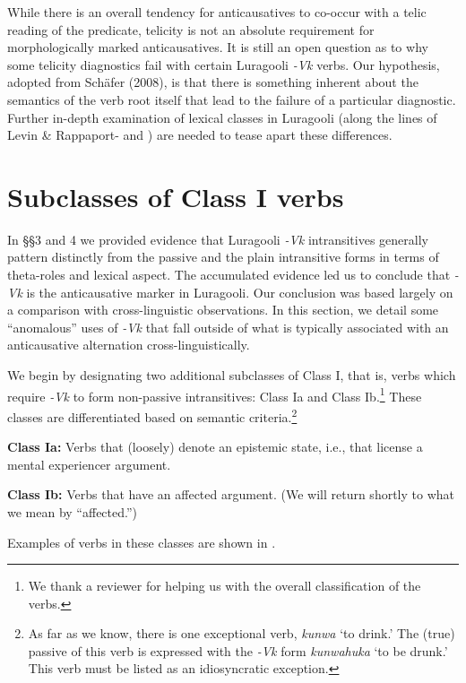 \documentclass[output=paper]{langsci/langscibook}
\begin{document}
While there is an overall tendency for anticausatives to co-occur with a telic reading of the predicate, telicity is not an absolute requirement for morphologically marked anticausatives. It is still an open question as to why some telicity diagnostics fail with certain Luragooli \textit{-Vk} verbs. Our hypothesis, adopted from Schäfer (2008), is that there is something inherent about the semantics of the verb root itself that lead to the failure of a particular diagnostic. Further in-depth examination of lexical classes in Luragooli (along the lines of Levin \& Rappaport-\citet{Hovav1995} and \citet{Haspelmath2005}) are needed to tease apart these differences. 

\section{Subclasses of Class I verbs}

In §§3 and 4 we provided evidence that Luragooli \textit{-Vk} intransitives generally pattern distinctly from the passive and the plain intransitive forms in terms of theta-roles and lexical aspect. The accumulated evidence led us to conclude that \textit{-Vk} is the anticausative marker in Luragooli. Our conclusion was based largely on a comparison with cross-linguistic observations. In this section, we detail some “anomalous” uses of \textit{-Vk} that fall outside of what is typically associated with an anticausative alternation cross-linguistically.

We begin by designating two additional subclasses of Class I, that is, verbs which require \textit{-Vk} to form non-passive intransitives: Class Ia and Class Ib.\footnote{We thank a reviewer for helping us with the overall classification of the verbs.} These classes are differentiated based on semantic criteria.\footnote{ As far as we know, there is one exceptional verb, \textit{kunwa} ‘to drink.’ The (true) passive of this verb is expressed with the \textit{-Vk }form \textit{kunwahuka }‘to be drunk.’ This verb must be listed as an idiosyncratic exception. }

\textbf{Class Ia:} Verbs that (loosely) denote an epistemic state, i.e., that license a mental experiencer argument.

\textbf{Class Ib:} Verbs that have an affected argument. (We will return shortly to what we mean by “affected.”)

Examples of verbs in these classes are shown in .
\end{document}
